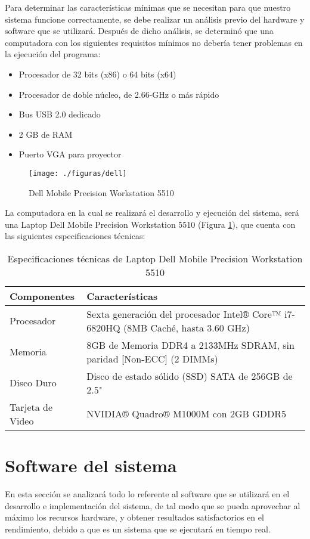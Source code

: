 \documentclass[a4paper,openright,12pt]{report}
\begin{document}
Para determinar las características mínimas que se necesitan para que nuestro sistema funcione correctamente, se debe realizar un análisis previo del hardware y software que se utilizará. Después de dicho análisis, se determinó que una computadora con los siguientes requisitos mínimos no debería tener problemas en la ejecución del programa:
\begin{itemize}
	\item Procesador de 32 bits (x86) o 64 bits (x64)
	\item Procesador de doble núcleo, de 2.66-GHz o más rápido
	\item Bus USB 2.0 dedicado
	\item 2 GB de RAM
	\item Puerto VGA para proyector
\end{itemize}
\begin{figure}[htb]
	\centering
	\texttt{[image: ./figuras/dell]}
	\caption{Dell Mobile Precision Workstation 5510}\label{fig:dell}
\end{figure}
La computadora en la cual se realizará el desarrollo y ejecución del sistema, será una Laptop Dell Mobile Precision Workstation 5510 (Figura \ref{fig:dell}), que cuenta con las siguientes especificaciones técnicas: 
\begin{table}[H]
	\centering
	\begin{tabular}{>{\arraybackslash}m{4cm} >{ \arraybackslash}m{9cm} }
		\hline
		Componentes & Características\\
		\hline \hline
		Procesador
		&
		Sexta generación del procesador Intel® Core™ i7-6820HQ (8MB Caché, hasta 3.60 GHz)
		\\
		\hline
		Memoria & 
		8GB de Memoria DDR4 a 2133MHz SDRAM, sin paridad [Non-ECC] (2 DIMMs)
		\\
		\hline
		Disco Duro &
		Disco de estado sólido (SSD) SATA de 256GB de 2.5"\\
		\hline
		Tarjeta de Video &
		NVIDIA® Quadro® M1000M con 2GB GDDR5\\
		\hline
	\end{tabular}
	\caption{Especificaciones técnicas de Laptop Dell Mobile Precision Workstation 5510}
	\label{tabla:especDell}
\end{table}
\section{Software del sistema}
En esta sección se analizará todo lo referente al software que se utilizará en el desarrollo e implementación del sistema, de tal modo que se pueda aprovechar al máximo los recursos hardware, y obtener resultados satisfactorios en el rendimiento, debido a que es un sistema que se ejecutará en tiempo real.
\end{document}
